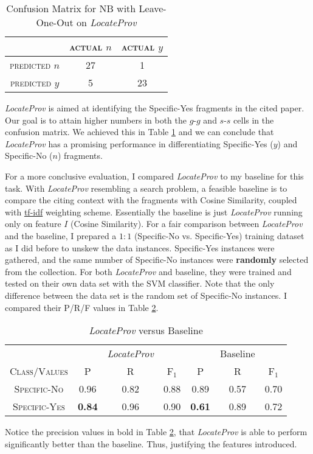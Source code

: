 \begin{table}[h]
	\center
	\begin{tabular}{ c | c  c }
		 & \textsc{actual $n$} & \textsc{actual $y$} \\
		\hline
		\textsc{predicted $n$} 	& 27 & 1 \\
		\textsc{predicted $y$}		& 5 & 23
	\end{tabular}
	\caption{Confusion Matrix for NB with Leave-One-Out on {\it LocateProv}}
	\label{tab:secondnbconfusionmatrix}
\end{table}
{\it LocateProv} is aimed at identifying the Specific-Yes fragments in the cited paper. Our goal is to attain higher numbers in both the $g$-$g$ and $s$-$s$ cells in the confusion matrix. We achieved this in Table \ref{tab:secondnbconfusionmatrix} and we can conclude that {\it LocateProv} has a promising performance in differentiating Specific-Yes ($y$) and Specific-No ($n$) fragments.

For a more conclusive evaluation, I compared {\it LocateProv} to my baseline for this task. With {\it LocateProv} resembling a search problem, a feasible baseline is to compare the citing context with the fragments with Cosine Similarity, coupled with \url{tf-idf} \cite{irtextbook} weighting scheme. Essentially the baseline is just {\it LocateProv} running only on feature $I$ (Cosine Similarity). For a fair comparison between {\it LocateProv} and the baseline, I prepared a $1:1$ (Specific-No vs. Specific-Yes) training dataset as I did before to unskew the data instances. Specific-Yes instances were gathered, and the same number of Specific-No instances were {\bf randomly} selected from the collection. For both {\it LocateProv} and baseline, they were trained and tested on their own data set with the SVM classifier. Note that the only difference between the data set is the random set of Specific-No instances. I compared their P/R/F values in Table \ref{tab:locateprov_vs_baseline}.

\begin{table}[h]
	\center
	\begin{tabular}{ c | c  c  c | c c c }
		& & {\it LocateProv} & & & Baseline \\
		\textsc{Class/Values} & \textsc{P} & \textsc{R} & \textsc{F$_1$} & \textsc{P} & \textsc{R} & \textsc{F$_1$}  \\
		\hline
		\textsc{Specific-No} 			& 0.96  &    0.82   &   0.88 & 0.89   &   0.57   &   0.70 \\
		\textsc{Specific-Yes} 			& {\bf 0.84}  &    0.96   &   0.90 & {\bf 0.61}   &   0.89   &   0.72 \\
	\end{tabular}
	\caption{{\it LocateProv} versus Baseline}
	\label{tab:locateprov_vs_baseline}
\end{table}
Notice the precision values in bold in Table \ref{tab:locateprov_vs_baseline}, that {\it LocateProv} is able to perform significantly better than the baseline. Thus, justifying the features introduced.
